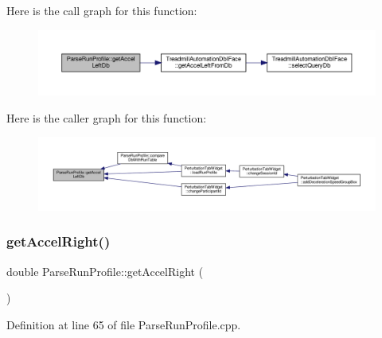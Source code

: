 Here is the call graph for this function\+:
\nopagebreak
\begin{figure}[H]
\begin{center}
\leavevmode
\includegraphics[width=350pt]{class_parse_run_profile_a482223e0ef3037dc97ae244ef1a481ae_cgraph}
\end{center}
\end{figure}
Here is the caller graph for this function\+:
\nopagebreak
\begin{figure}[H]
\begin{center}
\leavevmode
\includegraphics[width=350pt]{class_parse_run_profile_a482223e0ef3037dc97ae244ef1a481ae_icgraph}
\end{center}
\end{figure}
\mbox{\label{class_parse_run_profile_af5cde00690cd8d72674d713890d2e5a1}} 
\subsubsection{\texorpdfstring{get\+Accel\+Right()}{getAccelRight()}}
{\footnotesize\ttfamily double Parse\+Run\+Profile\+::get\+Accel\+Right (\begin{DoxyParamCaption}{ }\end{DoxyParamCaption})}



Definition at line 65 of file Parse\+Run\+Profile.\+cpp.

